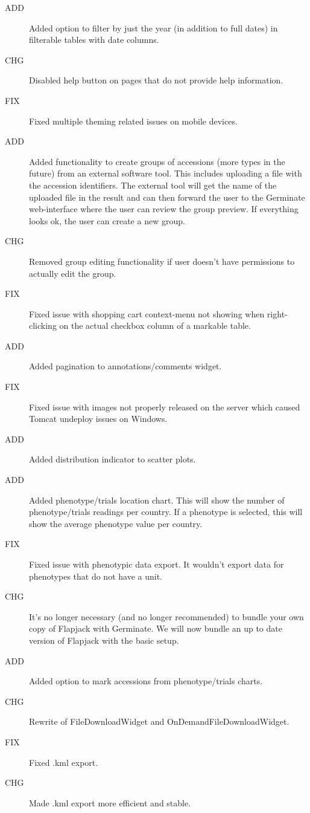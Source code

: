 \begin{description}
	  \item[ADD] Added option to filter by just the year (in addition to full dates) in filterable tables with date columns.
	  \item[CHG] Disabled help button on pages that do not provide help information.
	  \item[FIX] Fixed multiple theming related issues on mobile devices.
	  \item[ADD] Added functionality to create groups of accessions (more types in the future) from an external software tool. This includes uploading a file with the accession identifiers. The external tool will get the name of the uploaded file in the result and can then forward the user to the Germinate web-interface where the user can review the group preview. If everything looks ok, the user can create a new group.
	  \item[CHG] Removed group editing functionality if user doesn't have permissions to actually edit the group.
	  \item[FIX] Fixed issue with shopping cart context-menu not showing when right-clicking on the actual checkbox column of a markable table.
      \item[ADD] Added pagination to annotations/comments widget.
      \item[FIX] Fixed issue with images not properly released on the server which caused Tomcat undeploy issues on Windows.
      \item[ADD] Added distribution indicator to scatter plots.
      \item[ADD] Added phenotype/trials location chart. This will show the number of phenotype/trials readings per country. If a phenotype is selected, this will show the average phenotype value per country.
      \item[FIX] Fixed issue with phenotypic data export. It wouldn't export data for phenotypes that do not have a unit.
      \item[CHG] It's no longer necessary (and no longer recommended) to bundle your own copy of Flapjack with Germinate. We will now bundle an up to date version of Flapjack with the basic setup.
	  \item[ADD] Added option to mark accessions from phenotype/trials charts.
	  \item[CHG] Rewrite of FileDownloadWidget and OnDemandFileDownloadWidget.
	  \item[FIX] Fixed .kml export.
	  \item[CHG] Made .kml export more efficient and stable.

\end{description}
